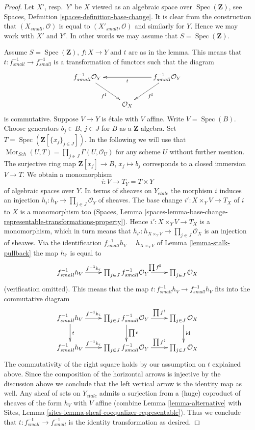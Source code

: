 \documentclass[10pt,a4paper]{amsart}
\theoremstyle{plain}
\theoremstyle{definition}
\theoremstyle{remark}
\numberwithin{equation}{subsection}
\def\Spec{\mathop{\mathrm{Spec}}}
\def\Sch{\mathit{Sch}}
\def\Mor{\mathop{\mathrm{Mor}}\nolimits}
\def\etale{{\acute{e}tale}}
\begin{document}
\begin{proof}
Let $X'$, resp.\ $Y'$ be $X$ viewed as an algebraic space over
$\Spec(\mathbf{Z})$, see
Spaces, Definition \ref{spaces-definition-base-change}.
It is clear from the construction that $(X_{small}, \mathcal{O})$
is equal to $(X'_{small}, \mathcal{O})$ and similarly for $Y$.
Hence we may work with $X'$ and $Y'$. In other words we may
assume that $S = \Spec(\mathbf{Z})$.

\medskip\noindent
Assume $S = \Spec(\mathbf{Z})$, $f : X \to Y$ and $t$ are as in
the lemma. This means that $t : f^{-1}_{small} \to f^{-1}_{small}$
is a transformation of functors such that the diagram
$$
\xymatrix{
f_{small}^{-1}\mathcal{O}_Y
\ar[rd]_{f^\sharp}  & &
f_{small}^{-1}\mathcal{O}_Y \ar[ll]^t \ar[ld]^{f^\sharp} \\
& \mathcal{O}_X
}
$$
is commutative. Suppose $V \to Y$ is \'etale with $V$ affine.
Write $V = \Spec(B)$. Choose generators $b_j \in B$, $j \in J$
for $B$ as a $\mathbf{Z}$-algebra. Set
$T = \Spec(\mathbf{Z}[\{x_j\}_{j \in J}])$.
In the following we will use that
$\Mor_{\Sch}(U, T) = \prod_{j \in J} \Gamma(U, \mathcal{O}_U)$
for any scheme $U$ without further mention.
The surjective ring map $\mathbf{Z}[x_j] \to B$, $x_j \mapsto b_j$
corresponds to a closed immersion $V \to T$.
We obtain a monomorphism
$$
i : V \longrightarrow T_Y = T \times Y
$$
of algebraic spaces over $Y$. In terms of sheaves on $Y_\etale$
the morphism $i$ induces an injection
$h_i : h_V \to \prod_{j \in J} \mathcal{O}_Y$ of sheaves.
The base change $i' : X \times_Y V \to T_X$ of $i$ to $X$
is a monomorphism too
(Spaces,
Lemma \ref{spaces-lemma-base-change-representable-transformations-property}).
Hence $i' : X \times_Y V \to T_X$ is a monomorphism, which
in turn means that
$h_{i'} : h_{X \times_Y V} \to \prod_{j \in J} \mathcal{O}_X$
is an injection of sheaves.
Via the identification $f_{small}^{-1}h_V = h_{X \times_Y V}$ of
Lemma \ref{lemma-stalk-pullback}
the map $h_{i'}$ is equal to
$$
\xymatrix{
f_{small}^{-1}h_V \ar[r]^-{f^{-1}h_i} &
\prod_{j \in J} f_{small}^{-1}\mathcal{O}_Y
\ar[r]^{\prod f^\sharp} &
\prod_{j \in J} \mathcal{O}_X
}
$$
(verification omitted). This means that the map
$t : f_{small}^{-1}h_V \to f_{small}^{-1}h_V$
fits into the commutative diagram
$$
\xymatrix{
f_{small}^{-1}h_V \ar[r]^-{f^{-1}h_i} \ar[d]^t &
\prod_{j \in J} f_{small}^{-1}\mathcal{O}_Y
\ar[r]^-{\prod f^\sharp} \ar[d]^{\prod t} &
\prod_{j \in J} \mathcal{O}_X \ar[d]^{\text{id}}\\
f_{small}^{-1}h_V \ar[r]^-{f^{-1}h_i} &
\prod_{j \in J} f_{small}^{-1}\mathcal{O}_Y
\ar[r]^-{\prod f^\sharp} &
\prod_{j \in J} \mathcal{O}_X
}
$$
The commutativity of the right square holds by our assumption on $t$
explained above.
Since the composition of the horizontal arrows is injective
by the discussion above we conclude that the left vertical arrow
is the identity map as well. Any sheaf of sets on
$Y_\etale$ admits a surjection from a (huge) coproduct of sheaves
of the form $h_V$ with $V$ affine (combine
Lemma \ref{lemma-alternative}
with
Sites, Lemma \ref{sites-lemma-sheaf-coequalizer-representable}).
Thus we conclude that $t : f_{small}^{-1} \to f_{small}^{-1}$
is the identity transformation as desired.
\end{proof}
\end{document}
